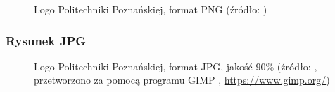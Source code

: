  \begin{figure}[ht]
  \centering
  \caption{Logo Politechniki Poznańskiej, format PNG (źródło: \cite{noauthor_materialy_nodate})}
  \label{fig:logoPP-PNG}
\end{figure}


\subsubsection{Rysunek JPG}

 \begin{figure}[ht]
\centering
  \caption{Logo Politechniki Poznańskiej, format JPG, jakość 90\% (źródło: \cite{noauthor_materialy_nodate}, przetworzono za pomocą programu GIMP \cite{noauthor_gimp_nodate}, \protect\url{https://www.gimp.org/})}
  \label{fig:logoPP-JPG}
\end{figure}


